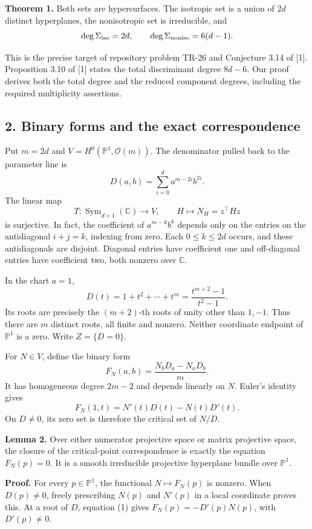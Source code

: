 \documentclass[
  11pt,
]{article}
\begin{document}
\textbf{Theorem 1.} Both sets are hypersurfaces. The isotropic set is a
union of \(2d\) distinct hyperplanes, the nonisotropic set is
irreducible, and \[
 \deg\Sigma_{\rm iso}=2d,\qquad
 \deg\Sigma_{\rm noniso}=6(d-1).
\]

This is the precise target of repository problem TR-26 and Conjecture
3.14 of {[}1{]}. Proposition 3.10 of {[}1{]} states the total
discriminant degree \(8d-6\). Our proof derives both the total degree
and the reduced component degrees, including the required multiplicity
assertions.

\subsection{2. Binary forms and the exact
correspondence}\label{binary-forms-and-the-exact-correspondence}

Put \(m=2d\) and \(V=H^0(\mathbb P^1,\mathcal O(m))\). The denominator
pulled back to the parameter line is \[
 D(a,b)=\sum_{i=0}^{d}a^{m-2i}b^{2i}.
\] The linear map \[
 T:\operatorname{Sym}_{d+1}(\mathbb C)\longrightarrow V,\qquad
 H\longmapsto N_H=z^\top Hz
\] is surjective. In fact, the coefficient of \(a^{m-k}b^k\) depends
only on the entries on the antidiagonal \(i+j=k\), indexing from zero.
Each \(0\le k\le2d\) occurs, and these antidiagonals are disjoint.
Diagonal entries have coefficient one and off-diagonal entries have
coefficient two, both nonzero over \(\mathbb C\).

In the chart \(a=1\), \[
 D(t)=1+t^2+\cdots+t^m=\frac{t^{m+2}-1}{t^2-1}.
\] Its roots are precisely the \((m+2)\)-th roots of unity other than
\(1,-1\). Thus there are \(m\) distinct roots, all finite and nonzero.
Neither coordinate endpoint of \(\mathbb P^1\) is a zero. Write
\(Z=\{D=0\}\).

For \(N\in V\), define the binary form \[
 F_N(a,b)=\frac{N_bD_a-N_aD_b}{m}.
\] It has homogeneous degree \(2m-2\) and depends linearly on \(N\).
Euler's identity gives \[
 F_N(1,t)=N'(t)D(t)-N(t)D'(t).
 \tag{1}
\] On \(D\ne0\), its zero set is therefore the critical set of \(N/D\).

\textbf{Lemma 2.} Over either numerator projective space or matrix
projective space, the closure of the critical-point correspondence is
exactly the equation \(F_N(p)=0\). It is a smooth irreducible projective
hyperplane bundle over \(\mathbb P^1\).

\textbf{Proof.} For every \(p\in\mathbb P^1\), the functional
\(N\mapsto F_N(p)\) is nonzero. When \(D(p)\ne0\), freely prescribing
\(N(p)\) and \(N'(p)\) in a local coordinate proves this. At a root of
\(D\), equation (1) gives \(F_N(p)=-D'(p)N(p)\), with \(D'(p)\ne0\).
\end{document}
